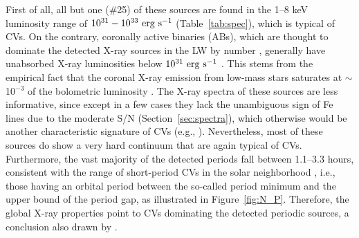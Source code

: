 \documentclass[fleqn,usenatbib]{mnras}
\begin{document}
First of all, all but one (\#25) of these sources are found in the 1--8 keV luminosity range of $10^{31}-10^{33}\rm~erg~s^{-1}$ (Table~\ref{tab:spec}), which is typical of CVs. 
On the contrary, coronally active binaries (ABs), which are thought to dominate the detected X-ray sources in the LW by number \citep{2009Natur.458.1142R}, generally have unabsorbed X-ray luminosities below $\rm 10^{31}~erg~s^{-1}$ \citep{2006A&A...450..117S}. 
This stems from the empirical fact that the coronal X-ray emission from low-mass stars saturates at $\sim$10$^{-3}$ of the bolometric luminosity \citep{2004A&ARv..12...71G}.
The X-ray spectra of these sources are less informative, since except in a few cases they lack the unambiguous sign of Fe lines due to the moderate S/N (Section~\ref{sec:spectra}), which otherwise would be another characteristic signature of CVs (e.g., \citealp{2016ApJ...818..136X}).
Nevertheless, most of these sources do show a very hard continuum that are again typical of CVs.
Furthermore, the vast majority of the detected periods fall between 1.1--3.3 hours, consistent with the range of short-period CVs in the solar neighborhood \citep{2003A&A...404..301R}, i.e., those having an orbital period between the so-called period minimum and the upper bound of the period gap, as illustrated in Figure~\ref{fig:N_P}. 
Therefore, the global X-ray properties point to CVs dominating the detected periodic sources, a conclusion also drawn by \cite{2012ApJ...746..165H}.
\end{document}
